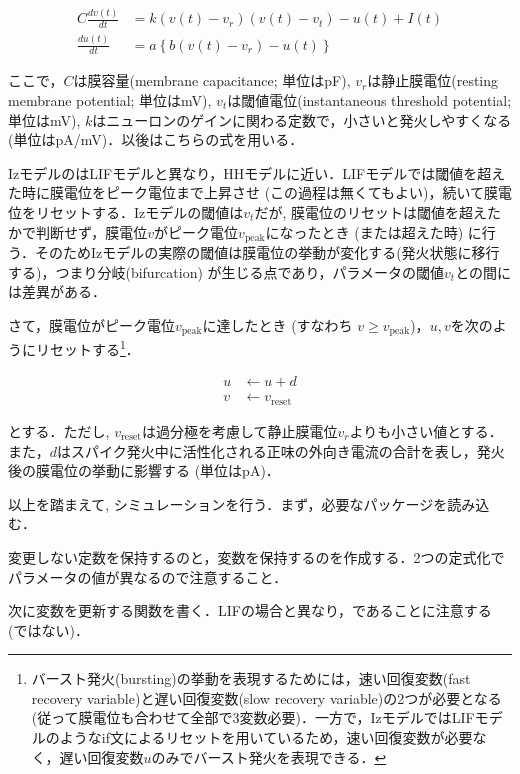 \begin{align}
C\frac{dv(t)}{dt}&=k\left(v(t)-v_r\right)\left(v(t)-v_t\right)-u(t)+I(t) \\
\frac{du(t)}{dt}&=a\left\{b\left(v(t)-v_{r}\right)-u(t)\right\}
\end{align} 


ここで，$C$は膜容量(membrane capacitance; 単位はpF), $v_r$は静止膜電位(resting membrane potential; 単位はmV), $v_t$は閾値電位(instantaneous threshold potential; 単位はmV), $k$はニューロンのゲインに関わる定数で，小さいと発火しやすくなる (単位はpA/mV)．以後はこちらの式を用いる．

Izモデルの\textbf{}はLIFモデルと異なり，HHモデルに近い．LIFモデルでは閾値を超えた時に膜電位をピーク電位まで上昇させ (この過程は無くてもよい)，続いて膜電位をリセットする．Izモデルの閾値は$v_t$だが, 膜電位のリセットは閾値を超えたかで判断せず，膜電位$v$がピーク電位$v_{\text{peak}}$になったとき (または超えた時) に行う．そのためIzモデルの実際の閾値は膜電位の挙動が変化する(発火状態に移行する)，つまり分岐(bifurcation) が生じる点であり，パラメータの閾値$v_t$との間には差異がある．

さて，膜電位がピーク電位$v_{\text{peak}}$に達したとき (すなわち  $v \geq v_{\text{peak}}$)，$u, v$を次のようにリセットする\footnote{バースト発火(bursting)の挙動を表現するためには，速い回復変数(fast recovery variable)と遅い回復変数(slow recovery variable)の2つが必要となる(従って膜電位も合わせて全部で3変数必要)．一方で，IzモデルではLIFモデルのようなif文によるリセットを用いているため，速い回復変数が必要なく，遅い回復変数$u$のみでバースト発火を表現できる．}．


\begin{align} 
u&\leftarrow u+d\\
v&\leftarrow v_{\text{reset}}
\end{align}


とする．ただし, $v_{\text{reset}}$は過分極を考慮して静止膜電位$v_r$よりも小さい値とする．また，$d$はスパイク発火中に活性化される正味の外向き電流の合計を表し，発火後の膜電位の挙動に影響する (単位はpA)．

以上を踏まえて, シミュレーションを行う．まず，必要なパッケージを読み込む．

変更しない定数を保持するのと，変数を保持するのを作成する．2つの定式化でパラメータの値が異なるので注意すること．

次に変数を更新する関数を書く．LIFの場合と異なり，であることに注意する (ではない)．

